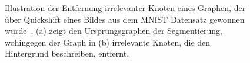 \begin{figure}[t]
\centering
{}
\hspace{1cm}
\caption[Entfernung irrelevanter Knoten]{Illustration der Entfernung irrelevanter Knoten eines Graphen, der über Quickshift eines Bildes aus dem \gls{MNIST} Datensatz gewonnen wurde~\cite{mnist}.
(a) zeigt den Ursprungsgraphen der Segmentierung, wohingegen der Graph in (b) irrelevante Knoten, die den Hintergrund beschreiben, entfernt.}
\label{fig:knotenentfernung}
\end{figure}
